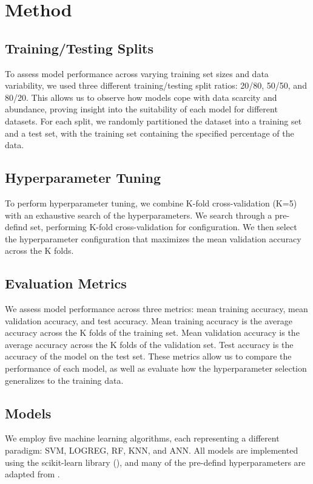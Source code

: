 \documentclass{article}
\begin{document}
\section{Method}

\subsection{Training/Testing Splits}
To assess model performance across varying training set sizes and data
variability, we used three different training/testing split ratios: 20/80,
50/50, and 80/20. This allows us to observe how models cope with data scarcity
and abundance, proving insight into the suitability of each model for different
datasets. For each split, we randomly partitioned the dataset into a training
set and a test set, with the training set containing the specified percentage
of the data.

\subsection {Hyperparameter Tuning}
To perform hyperparameter tuning, we combine K-fold cross-validation (K=5) with
an exhaustive search of the hyperparameters. We search through a pre-defind
set, performing K-fold cross-validation for configuration. We then select the
hyperparameter configuration that maximizes the mean validation accuracy across
the K folds.

\subsection{Evaluation Metrics}
We assess model performance across three metrics: mean training accuracy, mean
validation accuracy, and test accuracy. Mean training accuracy is the average
accuracy across the K folds of the training set. Mean validation accuracy is
the average accuracy across the K folds of the validation set. Test accuracy is
the accuracy of the model on the test set. These metrics allow us to compare
the performance of each model, as well as evaluate how the hyperparameter
selection generalizes to the training data.

\subsection{Models}

We employ five machine learning algorithms, each representing a different
paradigm: SVM, LOGREG, RF, KNN, and ANN. All models are implemented using the
scikit-learn library (\citet{scikit-learn}), and many of the pre-defind
hyperparameters are adapted from \citet{empirical-comparison}.
\end{document}
